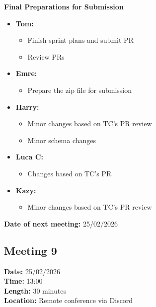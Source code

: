 \documentclass[11pt]{article}
\begin{document}
    \textbf{Final Preparations for Submission}
    \begin{itemize}
        \item \textbf{Tom:}
        \begin{itemize}
            \item Finish sprint plans and submit PR
            \item Review PRs
        \end{itemize}

        \item \textbf{Emre:}
        \begin{itemize}
            \item Prepare the zip file for submission
        \end{itemize}

        \item \textbf{Harry:}
        \begin{itemize}
            \item Minor changes based on TC's PR review
            \item Minor schema changes
        \end{itemize}

        \item \textbf{Luca C:}
        \begin{itemize}
            \item Changes based on TC's PR
        \end{itemize}

        \item \textbf{Kazy:}
        \begin{itemize}
            \item Minor changes based on TC's PR review
        \end{itemize}
    \end{itemize}

    \textbf{Date of next meeting:} 25/02/2026

    \vspace{1.5\baselineskip}
    \subsection{Meeting 9}

    \textbf{Date:} 25/02/2026 \\
    \textbf{Time:} 13:00 \\
    \textbf{Length:} 30 minutes \\
    \textbf{Location:} Remote conference via Discord
\end{document}

